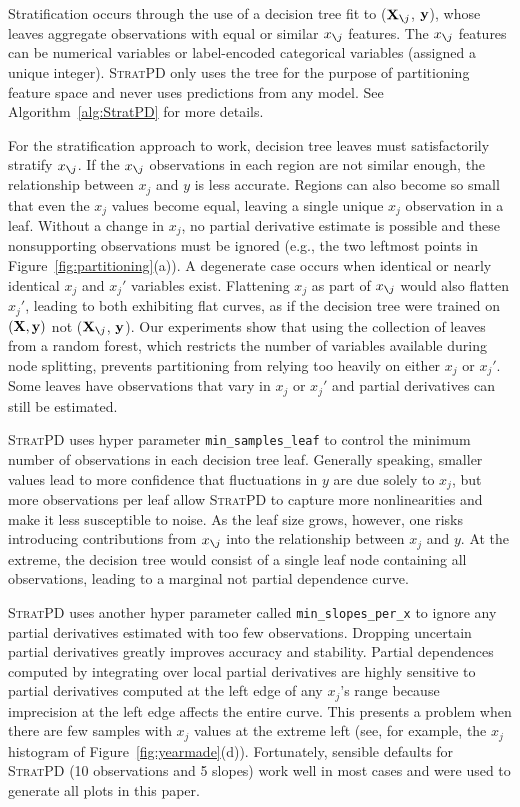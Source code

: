 \documentclass[smallextended]{svjour3}       %
\newcommand{\figref}[1]{Figure~\ref{#1}}
\newcommand{\algref}[1]{Algorithm~\ref{#1}}
\newcommand{\spd}{\fontfamily{cmr}\textsc{\small StratPD}}
\newcommand{\Xnj}{${\bf X}_{\texttt{\char`\\} j}$}
\newcommand{\xnj}{$x_{\texttt{\char`\\} j}$}
\begin{document}
Stratification occurs through the use of a decision tree fit to (\Xnj, $\bf y$), whose leaves aggregate observations with equal or similar \xnj{} features. The \xnj{} features can be numerical variables or label-encoded categorical variables (assigned a unique integer). \spd{} only uses the tree for the purpose of partitioning feature space and never uses predictions from any model. See \algref{alg:StratPD} for more details.

For the stratification approach to work, decision tree leaves must satisfactorily stratify \xnj{}. If the \xnj{} observations in each region are not similar enough, the relationship between $x_j$ and $y$   is less accurate.  Regions can also become so small that even the $x_j$ values become equal, leaving a single unique $x_j$ observation in a leaf. Without a change in $x_j$, no partial derivative estimate is possible and these nonsupporting observations must be  ignored (e.g., the two leftmost points in \figref{fig:partitioning}(a)). A degenerate case occurs when identical or nearly identical $x_j$ and $x_j'$ variables exist. Flattening $x_j$ as part of \xnj{} would also flatten $x_j'$, leading to both exhibiting flat curves, as if the decision tree were trained on $(\bf X, y)$ not (\Xnj, $\bf y$). Our experiments show that using the collection of leaves from a random forest, which restricts the number of variables available during node splitting, prevents partitioning from relying too heavily on either $x_j$ or $x_j'$. Some leaves have observations that vary in $x_j$ or $x_j'$ and partial derivatives can still be estimated.

\spd{} uses hyper parameter {\tt\small min\_samples\_leaf} to control the minimum number of observations in each decision tree leaf.  Generally speaking, smaller values lead to more confidence that fluctuations in $y$ are due solely to $x_j$, but more observations per leaf allow \spd{} to capture more nonlinearities and make it less susceptible to noise.  As the leaf size grows, however, one risks introducing contributions from \xnj{} into the relationship between $x_j$ and $y$. At the extreme, the decision tree would consist of a single leaf node containing all observations, leading to a marginal not partial dependence curve.

\spd{} uses another hyper parameter called {\tt\small min\_slopes\_per\_x} to ignore any partial derivatives estimated with too few observations.  Dropping uncertain partial derivatives greatly improves accuracy and stability. Partial dependences computed by integrating over local partial derivatives are highly sensitive to partial derivatives computed at the left edge of any $x_j$'s range because imprecision at the left edge affects the entire curve.  This presents a problem when there are few samples with $x_j$ values at the extreme left (see, for example, the $x_j$ histogram of \figref{fig:yearmade}(d)).  Fortunately, sensible defaults for \spd{} (10 observations and 5 slopes) work well in most cases and  were used to generate all plots in this paper.
\end{document}
